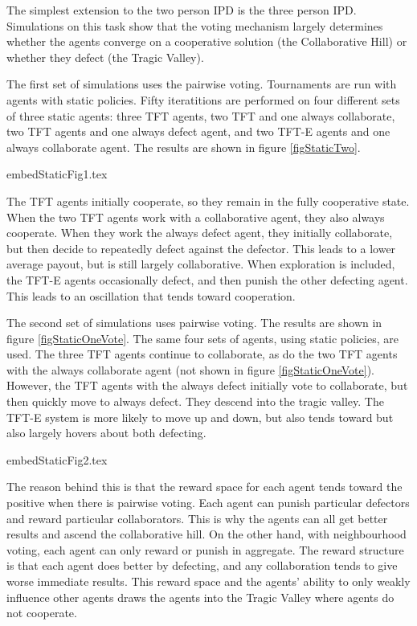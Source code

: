 \documentclass[]{llncs} %
\begin{document}
The simplest extension to the two person IPD is the three person IPD.
Simulations on this task show that the voting mechanism largely determines
whether the agents converge on a cooperative solution (the Collaborative
Hill) or whether they defect (the Tragic Valley).

The first set of simulations uses the pairwise voting.  Tournaments are
run with agents with static policies.  Fifty iteratitions are performed
on four different sets of three static agents: three TFT agents,
two TFT and one always collaborate, two TFT agents and one always defect
agent, and two TFT-E agents and one always collaborate agent.  The
results are shown in figure \ref {figStaticTwo}.

 {embedStaticFig1.tex}

The TFT agents initially cooperate, so they remain in the fully cooperative
state.  When the two TFT agents work with a collaborative agent, they also
always cooperate.  When they work the always defect agent, they initially
collaborate, but then decide to repeatedly defect against the defector.  This
leads to a lower average payout, but is still largely collaborative.  When
exploration is included, the TFT-E agents occasionally defect, and then
punish the other defecting agent.  This leads to an oscillation that tends
toward cooperation.  


The second set of simulations uses pairwise voting.  The results
are shown in figure \ref {figStaticOneVote}. The same four sets
of agents, using static policies, are used.  The three TFT agents continue
to collaborate, as do the two TFT agents with the always collaborate agent
(not shown in figure \ref {figStaticOneVote}).
However, the TFT agents with the always defect initially vote to collaborate,
but then quickly move to always defect.  They descend into the tragic valley.
The TFT-E system is more likely to move up and down, but also tends toward
but also largely hovers about both defecting.    

 {embedStaticFig2.tex}

The reason behind this is that the reward space for each agent tends
toward the positive when there is pairwise voting.  Each agent can
punish particular defectors and reward particular collaborators.  This
is why the agents can all get better results and ascend the
collaborative hill.  On the other hand, with neighbourhood voting,
each agent can only reward or punish in aggregate.  The reward structure is
that each agent does better by defecting, and any collaboration tends to
give worse immediate results.  This reward space and the agents' ability
to only weakly influence other agents draws the agents into the Tragic
Valley where agents do not cooperate.
\end{document}
